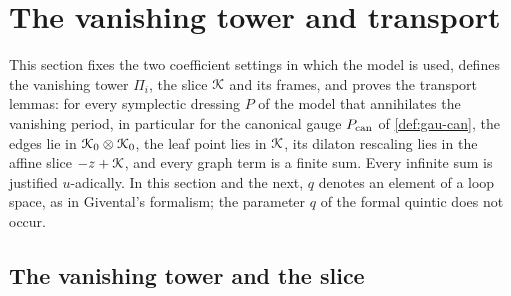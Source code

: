 
\section{The vanishing tower and transport}
\label{sec:tra}

This section fixes the two coefficient settings in which the model is used, defines the vanishing tower $\Pi_i$, the slice $\mathcal{K}$ and its frames, and proves the transport lemmas: for every symplectic dressing $P$ of the model that annihilates the vanishing period, in particular for the canonical gauge $P_{\mathrm{can}}$ of \cref{def:gau-can}, the edges lie in $\mathcal{K}_{0}\otimes\mathcal{K}_{0}$, the leaf point lies in $\mathcal{K}$, its dilaton rescaling lies in the affine slice $-z+\mathcal{K}$, and every graph term is a finite sum. Every infinite sum is justified $u$-adically. In this section and the next, $q$ denotes an element of a loop space, as in Givental's formalism; the parameter $q$ of the formal quintic does not occur.

\subsection{The vanishing tower and the slice}
\label{sec:tra-tower}

